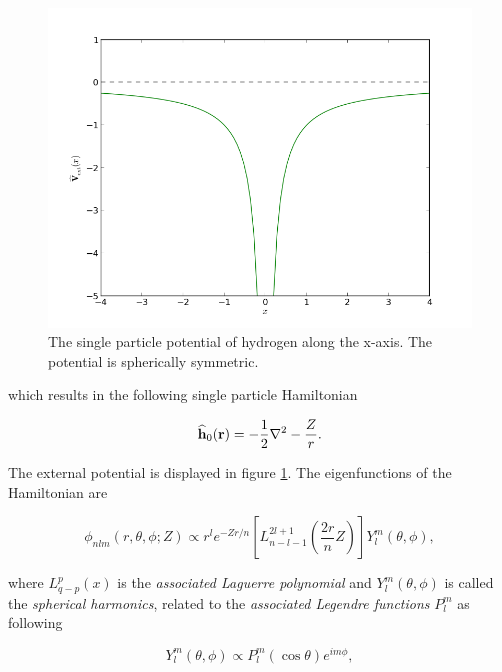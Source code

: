 \begin{figure}
 \begin{center}
  \includegraphics[scale=0.5]{../Graphics/Potentials/hydrogen.png}
  \caption{The single particle potential of hydrogen along the x-axis. The potential is spherically symmetric.}
  \label{fig:extPotHydrogen}
 \end{center}
\end{figure}

which results in the following single particle Hamiltonian

\begin{equation}
 {\bf\widehat{h}}_0(\mathbf{r}) = -\frac{1}{2}\nabla^2 - \frac{Z}{r}.
\end{equation}

The external potential is displayed in figure \ref{fig:extPotHydrogen}. The eigenfunctions of the Hamiltonian are

\begin{equation}
 \phi_{nlm}(r, \theta, \phi; Z) \propto r^l e^{-Zr/n}\left[L_{n-l-1}^{2l+1}\left(\frac{2r}{n}Z\right)\right] Y_l^m(\theta, \phi), \label{eq:hydrogenBasisComplex}
\end{equation}

where $L_{q-p}^p(x)$ is the \textit{associated Laguerre polynomial} and $Y_l^m(\theta, \phi)$ is called the \textit{spherical harmonics}, related to the \textit{associated Legendre functions} $P_l^m$ as following

\begin{equation}
 Y_l^m(\theta, \phi) \propto   P_l^m(\cos\theta)e^{im\phi}, \label{eq:spherHarm}
\end{equation}

